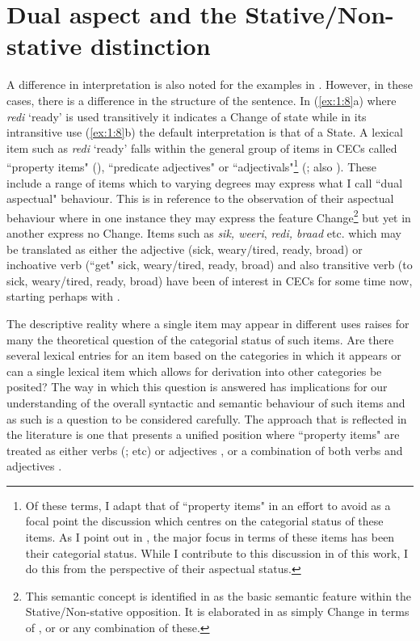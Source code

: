 \section{Dual aspect and the Stative/Non-stative distinction}\label{sec:1.5}

A difference in interpretation is also noted for the examples in .
However, in these cases, there is a difference in the structure of the sentence.
In (\ref{ex:1:8}a) where \textit{redi} `ready' is used transitively it indicates
a Change of state while in its intransitive use (\ref{ex:1:8}b) the default
interpretation is that of a State.  A lexical item such as \textit{redi} `ready' falls
within the general group of items in CECs called ``property items"
(\citealt{Migge2000,Winford1993}), ``predicate adjectives" \citep{Seuren1986} or
``adjectivals"\footnote{Of these terms, I adapt that of ``property items" in an
  effort to avoid as a focal point the discussion which centres on the
  categorial status of these items.  As I point out in , the major
focus in terms of these items has been their categorial status. While I
contribute to this discussion in  of this work, I do this from the
perspective of their aspectual status.} (\citealt{Kouwenberg1996}; also
\citealt{Sebba1986}).  These include a range of items which to varying degrees
may express what I call ``dual aspectual" behaviour.  This is in reference to the
observation of their aspectual behaviour where in one instance they may express
the feature Change\footnote{This semantic concept is identified in 
as the basic semantic feature within the Stative\slash Non-stative opposition. It is
elaborated in  as simply Change in terms of \MOTION, \CHANGEOFSTATE 
or \CONTACT or any combination of these.} but yet in another express no
Change.  Items such as \textit{sik, weeri}, \textit{redi, braad} etc. which may
be translated as either the adjective (sick, weary\slash tired, ready, broad) or
inchoative verb (\BECOME ``get" sick, weary\slash tired, ready, broad) and also
transitive verb (\CAUSE to \BECOME sick, weary\slash tired, ready, broad) have been of
interest in CECs for some time now, starting perhaps with \citet{Voorhoeve1957}.

The descriptive reality where a single item may appear in different uses raises
for many the theoretical question of the categorial status of such items.  Are
there several lexical entries for an item based on the categories in which it
appears or can a single lexical item which allows for derivation into other
categories be posited?  The way in which this question is answered has
implications for our understanding of the overall syntactic and semantic
behaviour of such items and as such is a question to be considered carefully.
The approach that is reflected in the literature is one that presents a unified
position where ``property items" are treated as either verbs
(\citealt{Alleyne1980,Jaganauth1987,Sebba1986,Winford1993}; etc) or adjectives
\citep{Seuren1986}, or a combination of both verbs and adjectives
\citep{Kouwenberg1996}.

